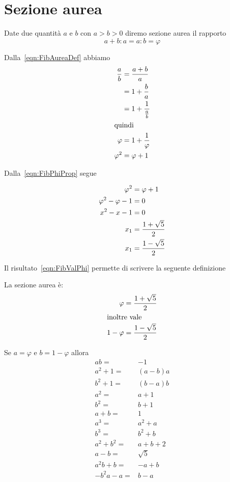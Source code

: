 \section{Sezione aurea}
\begin{defn}
	Date due quantità $a$ e $b$ con $a>b>0$ diremo sezione aurea il rapporto
	\begin{equation}
	a+b:a=a:b=\varphi	
	\end{equation}\label{eqn:FibAureaDef}
\end{defn}
\begin{prop}
	Dalla~\vref{eqn:FibAureaDef} abbiamo
	\begin{align}
		\dfrac{a}{b}={}&\dfrac{a+b}{a}\notag\\
		={}&1+\dfrac{b}{a}\notag\\
		={}&1+\dfrac{1}{\frac{a}{b}}\notag\\
		\intertext{quindi}
		\varphi={}&1+\dfrac{1}{\varphi}\label{eqn:FibPhiProp}\\
		\varphi^2={}&\varphi+1\notag
	\end{align}
\end{prop}
	Dalla~\vref{eqn:FibPhiProp} segue
	\begin{prop}
	\begin{align}
		\varphi^2={}&\varphi+1\notag\\
		\varphi^2-\varphi-1={}&0\notag\\
		x^2-x-1={}&0\label{eqn:FibValPhiEqua}\\
		x_1={}&\dfrac{1+\sqrt{5}}{2}\label{eqn:FibValPhi}\\
		x_1={}&\dfrac{1-\sqrt{5}}{2}\notag
	\end{align}
\end{prop}
Il risultato~\ref{eqn:FibValPhi} permette di scrivere la seguente definizione
\begin{defn}
La sezione aurea è: 
\begin{align*}
	\varphi={}&\dfrac{1+\sqrt{5}}{2}\\
\intertext{inoltre vale}
	1-	\varphi={}&\dfrac{1-\sqrt{5}}{2}\\
\end{align*}
\end{defn}
\begin{lem}[Proprietà]\label{lem:FibpropPhi}
	Se $a=\varphi$ e  $b=1-\varphi$ allora
	\begin{align*}
		ab={}&-1\\
		a^2+1={}&(a-b)a\\
		b^2+1={}&(b-a)b\\
		a^2={}&a+1\\
		b^2={}&b+1\\
		a+b={}&1\\
		a^3={}&a^2+a\\
		b^3={}&b^2+b\\
		a^2+b^2={}&a+b+2\\
	a-b={}&\sqrt{5}\\
	a^2b+b={}&-a+b\\
	-b^2a-a={}&b-a\\
		\end{align*}
\end{lem}
